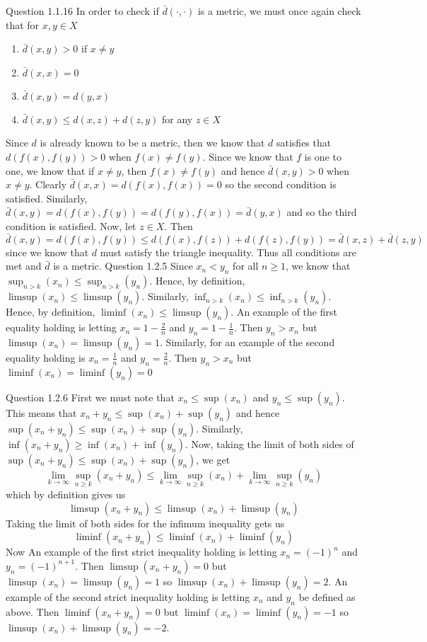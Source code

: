\documentclass[12pt]{exam}
\begin{document}
\begin{questions}
\question Question 1.1.16\newline
In order to check if $\bar{d}(\cdot, \cdot)$ is a metric, we must once again check that for $x,y \in X$ \begin{enumerate}
    \item $\bar{d}(x,y) > 0$ if $x \neq y$ 
    \item $\bar{d}(x,x) = 0$
    \item $\bar{d}(x,y) = d(y,x)$
    \item $\bar{d}(x,y) \leq d(x,z) + d(z,y)$ for any $z\in X$
\end{enumerate}
Since $d$ is already known to be a metric, then we know that $d$ satisfies that $d(f(x), f(y))> 0$ when $f(x) \neq f(y)$. Since we know that $f$ is one to one, we know that if $x \neq y$, then $f(x) \neq f(y)$ and hence $\bar{d}(x,y) > 0$ when $x\neq y$. Clearly $\bar{d}(x,x) = d(f(x),f(x)) = 0$ so the second condition is satisfied. Similarly,   $\bar{d}(x,y) = d(f(x),f(y)) = d(f(y),f(x)) = \bar{d}(y,x)$ and so the third condition is satisfied. Now, let $z\in X$. Then $\bar{d}(x,y) = d(f(x),f(y)) \leq d(f(x),f(z)) + d(f(z),f(y)) = \bar{d}(x,z) +\bar{d}(z,y)$ since we know that $d$ must satisfy the triangle inequality. Thus all conditions are met and $\bar{d}$ is a metric. 
\question Question 1.2.5\newline
Since $x_n < y_n$ for all $n\geq 1$, we know that $\sup_{n > k}(x_n) \leq \sup_{n > k}(y_n)$. Hence, by definition, $\limsup(x_n) \leq \limsup(y_n)$. Similarly,  $\inf_{n > k}(x_n) \leq \inf_{n > k}(y_n)$. Hence, by definition, $\liminf(x_n) \leq \limsup(y_n)$. \newline  An example of the first equality holding is letting $x_n = 1-\frac{2}{n}$ and $y_n = 1-\frac{1}{n}$. Then $y_n > x_n$ but $\limsup(x_n) = \limsup(y_n) = 1$. Similarly, for an example of the second equality holding is $x_n =\frac{1}{n}$ and $y_n = \frac{2}{n}$. Then $y_n > x_n$ but $\liminf(x_n) = \liminf(y_n) = 0$

\question Question 1.2.6 \newline
First we must note that $x_n \leq \sup(x_n)$ and $y_n\leq \sup(y_n)$. This means that $x_n + y_n \leq \sup(x_n)+\sup(y_n)$ and hence $\sup(x_n + y_n) \leq \sup(x_n)+\sup(y_n)$. Similarly,  $\inf(x_n + y_n) \geq \inf(x_n)+\inf(y_n)$. Now, taking the limit of both sides of $\sup(x_n + y_n) \leq \sup(x_n)+\sup(y_n)$, we get \[\lim_{k\rightarrow \infty}\sup_{n\geq k}(x_n + y_n) \leq \lim_{k\rightarrow \infty}\sup_{n\geq k}(x_n)+\lim_{k\rightarrow \infty}\sup_{n\geq k}(y_n)\] which by definition gives us \[\limsup(x_n + y_n) \leq \limsup(x_n)+\limsup(y_n)\] Taking the limit of both sides for the infimum inequality gets us \[\liminf(x_n + y_n) \leq \liminf(x_n)+\liminf(y_n)\] Now An example of the first strict inequality holding is letting $x_n = (-1)^n$ and $y_n = (-1)^{n+1}$. Then $\limsup(x_n+y_n) = 0$ but $\limsup(x_n) = \limsup(y_n) = 1$ so $\limsup(x_n) +\limsup(y_n) = 2$. An example of the second strict inequality holding is letting $x_n$ and $y_n$ be defined as above. Then $\liminf(x_n+y_n) = 0$ but $\liminf(x_n) = \liminf(y_n) = -1$ so $\limsup(x_n) +\limsup(y_n) = -2$.


\end{questions}
\end{document}
